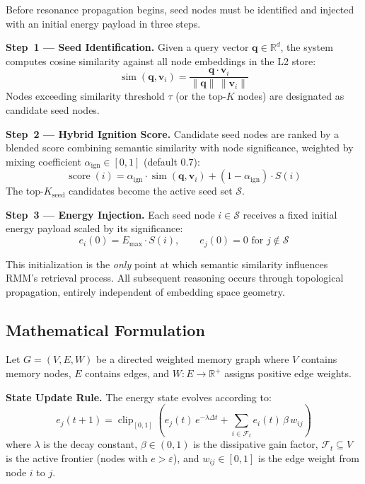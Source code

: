 \documentclass[11pt]{article}
\begin{document}
Before resonance propagation begins, seed nodes must be identified and
injected with an initial energy payload in three steps.

\textbf{Step~1 --- Seed Identification.}
Given a query vector $\mathbf{q} \in \mathbb{R}^d$, the system computes
cosine similarity against all node embeddings in the L2 store:
\begin{equation}
  \operatorname{sim}(\mathbf{q}, \mathbf{v}_i)
  = \frac{\mathbf{q} \cdot \mathbf{v}_i}{\|\mathbf{q}\|\,\|\mathbf{v}_i\|}
\end{equation}
Nodes exceeding similarity threshold $\tau$ (or the top-$K$ nodes) are
designated as candidate seed nodes.

\textbf{Step~2 --- Hybrid Ignition Score.}
Candidate seed nodes are ranked by a blended score combining semantic
similarity with node significance, weighted by mixing coefficient
$\alpha_{\mathrm{ign}} \in [0,1]$ (default $0.7$):
\begin{equation}
  \operatorname{score}(i)
  = \alpha_{\mathrm{ign}} \cdot \operatorname{sim}(\mathbf{q}, \mathbf{v}_i)
  + (1 - \alpha_{\mathrm{ign}}) \cdot S(i)
\end{equation}
The top-$K_{\mathrm{seed}}$ candidates become the active seed set
$\mathcal{S}$.

\textbf{Step~3 --- Energy Injection.}
Each seed node $i \in \mathcal{S}$ receives a fixed initial energy
payload scaled by its significance:
\begin{equation}
  e_i(0) = E_{\max} \cdot S(i), \qquad
  e_j(0) = 0 \text{ for } j \notin \mathcal{S}
\end{equation}

This initialization is the \emph{only} point at which semantic
similarity influences RMM's retrieval process. All subsequent reasoning
occurs through topological propagation, entirely independent of
embedding space geometry.

\subsection{Mathematical Formulation}

Let $G = (V, E, W)$ be a directed weighted memory graph where $V$
contains memory nodes, $E$ contains edges, and
$W: E \to \mathbb{R}^+$ assigns positive edge weights.

\textbf{State Update Rule.} The energy state evolves according to:
\begin{equation}\label{eq:update}
  e_j(t+1) = \operatorname{clip}_{[0,1]}\!\left(
    e_j(t)\,e^{-\lambda\Delta t}
    + \sum_{i \in \mathcal{F}_t} e_i(t)\,\beta\,w_{ij}
  \right)
\end{equation}
where $\lambda$ is the decay constant, $\beta \in (0,1)$ is the
dissipative gain factor, $\mathcal{F}_t \subseteq V$ is the active
frontier (nodes with $e > \varepsilon$), and $w_{ij} \in [0,1]$ is the
edge weight from node $i$ to $j$.
\end{document}
